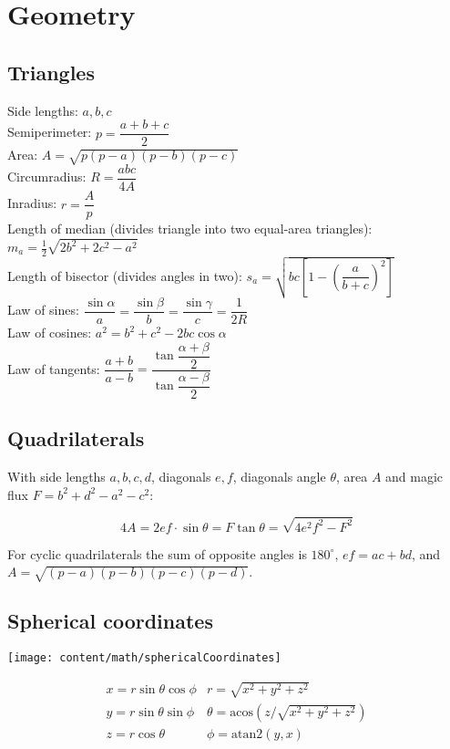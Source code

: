 \section{Geometry}

\subsection{Triangles}
Side lengths: $a,b,c$\\
Semiperimeter: $p=\dfrac{a+b+c}{2}$\\
Area: $A=\sqrt{p(p-a)(p-b)(p-c)}$\\
Circumradius: $R=\dfrac{abc}{4A}$\\
Inradius: $r=\dfrac{A}{p}$\\
Length of median (divides triangle into two equal-area triangles): $m_a=\tfrac{1}{2}\sqrt{2b^2+2c^2-a^2}$\\
Length of bisector (divides angles in two): $s_a=\sqrt{bc\left[1-\left(\dfrac{a}{b+c}\right)^2\right]}$\\
Law of sines: $\dfrac{\sin\alpha}{a}=\dfrac{\sin\beta}{b}=\dfrac{\sin\gamma}{c}=\dfrac{1}{2R}$\\
Law of cosines: $a^2=b^2+c^2-2bc\cos\alpha$\\
Law of tangents: $\dfrac{a+b}{a-b}=\dfrac{\tan\dfrac{\alpha+\beta}{2}}{\tan\dfrac{\alpha-\beta}{2}}$\\

\subsection{Quadrilaterals}
With side lengths $a,b,c,d$, diagonals $e, f$, diagonals angle $\theta$, area $A$ and
magic flux $F=b^2+d^2-a^2-c^2$:

\[ 4A = 2ef \cdot \sin\theta = F\tan\theta = \sqrt{4e^2f^2-F^2} \]

 For cyclic quadrilaterals the sum of opposite angles is $180^\circ$,
$ef = ac + bd$, and $A = \sqrt{(p-a)(p-b)(p-c)(p-d)}$.

\subsection{Spherical coordinates}
\begin{center}
\texttt{[image: content/math/sphericalCoordinates]}
\end{center}
\[\begin{array}{cc}
x = r\sin\theta\cos\phi & r = \sqrt{x^2+y^2+z^2}\\
y = r\sin\theta\sin\phi & \theta = \textrm{acos}(z/\sqrt{x^2+y^2+z^2})\\
z = r\cos\theta & \phi = \textrm{atan2}(y,x)
\end{array}\]

